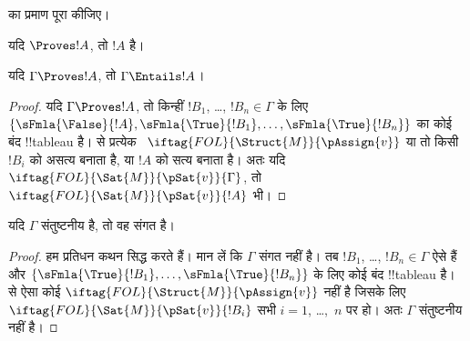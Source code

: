 \documentclass[../../../include/open-logic-section]{subfiles}
\begin{document}
\begin{prob}
 का प्रमाण पूरा कीजिए।
\end{prob}
\tagendprob

\begin{cor}
यदि $\Proves !A$, तो $!A$  है।
\end{cor}

\begin{cor}
यदि $\Gamma \Proves !A$, तो $\Gamma \Entails !A$।
\end{cor}

\begin{proof}
  यदि $\Gamma \Proves !A$, तो किन्हीं $!B_1$, \dots, $!B_n \in
  \Gamma$ के लिए $\{\sFmla{\False}{!A}, \sFmla{\True}{!B_1}, \dots,
  \sFmla{\True}{!B_n}\}$ का कोई बंद !!{tableau} है।
   से प्रत्येक
  ~$\iftag{FOL}{\Struct{M}}{\pAssign{v}}$
  या तो किसी $!B_i$ को असत्य बनाता है, या $!A$ को सत्य बनाता है। अतः यदि
  $\iftag{FOL}{\Sat{M}}{\pSat{v}}{\Gamma}$, तो
  $\iftag{FOL}{\Sat{M}}{\pSat{v}}{!A}$ भी।
\end{proof}

\begin{cor}
यदि $\Gamma$ संतुष्टनीय है, तो वह संगत है।
\end{cor}

\begin{proof}
हम प्रतिधन कथन सिद्ध करते हैं। मान लें कि $\Gamma$ संगत नहीं है। तब
$!B_1$, \dots, $!B_n \in \Gamma$ ऐसे हैं और
$\{\sFmla{\True}{!B_1}, \dots, \sFmla{\True}{!B_n}\}$ के लिए कोई बंद
!!{tableau} है।  से ऐसा कोई
$\iftag{FOL}{\Struct{M}}{\pAssign{v}}$ नहीं है जिसके लिए
$\iftag{FOL}{\Sat{M}}{\pSat{v}}{!B_i}$ सभी $i=1$, \dots,~$n$ पर हो। अतः
$\Gamma$ संतुष्टनीय नहीं है।
\end{proof}
\end{document}
